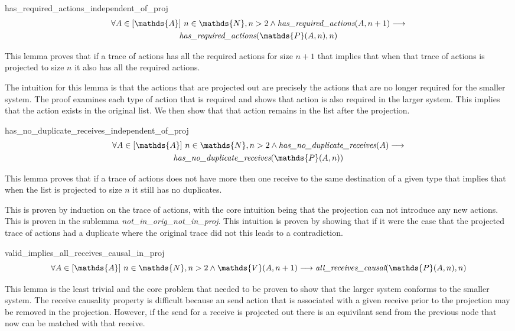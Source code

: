 \documentclass[runningheads]{llncs}
\newcommand{\action}{\mathds{A}}
\newcommand{\listaction}{[\action]}
\newcommand{\actsvalid}[2]{\mathds{V}(#1, #2)}
\newcommand{\projectsize}[2]{\mathds{P}(#1, #2)}
\newcommand{\hra}[2]{\emph{has\_required\_actions}(#1, #2)}
\newcommand{\hndr}[1]{\emph{has\_no\_duplicate\_receives}(#1)}
\newcommand{\allrc}[2]{\emph{all\_receives\_causal}(#1, #2)}
\begin{document}
\begin{lemma}{has\_required\_actions\_independent\_of\_proj}
\begin{multline*}
\forall A \in \listaction\ n \in \mathds{N}, n > 2 \wedge \hra{A}{n+1} \longrightarrow \\
\hra{\projectsize{A}{n}}{n}
\end{multline*}
\end{lemma}


This lemma proves that if a trace of actions has all the required actions for size $n+1$ that implies that when that trace of actions is projected to size $n$ it also has all the required actions. 

The intuition for this lemma is that the actions that are projected out are precisely the actions that are no longer required for the smaller system. The proof examines each type of action that is required and shows that action is also required in the larger system. This implies that the action exists in the original list. We then show that that action remains in the list after the projection.

\begin{lemma}{has\_no\_duplicate\_receives\_independent\_of\_proj}
\begin{multline*}
\forall A \in \listaction\ n \in \mathds{N}, n > 2 \wedge \hndr{A} \longrightarrow \\
\hndr{\projectsize{A}{n}}
\end{multline*}
\end{lemma}
This lemma proves that if a trace of actions does not have more then one receive to the same destination of a given type that implies that when the list is projected to size $n$ it still has no duplicates.

This is proven by induction on the trace of actions, with the core intuition being that the projection can not introduce any new actions. This is proven in the sublemma \emph{not\_in\_orig\_not\_in\_proj}. This intuition is proven by showing that if it were the case that the projected trace of actions had a duplicate where the original trace did not this leads to a contradiction. 


\begin{lemma}{valid\_implies\_all\_receives\_causal\_in\_proj}
$$ \forall A \in \listaction\ n \in \mathds{N}, n > 2 \wedge \actsvalid{A}{n+1} \longrightarrow \allrc{\projectsize{A}{n}}{n} $$
\end{lemma}
This lemma is the least trivial and the core problem that needed to be proven to show that the larger system conforms to the smaller system. The receive causality property is difficult because an send action that is associated with a given receive prior to the projection may be removed in the projection. However, if the send for a receive is projected out there is an equivilant send from the previous node that now can be matched with that receive. 
\end{document}
